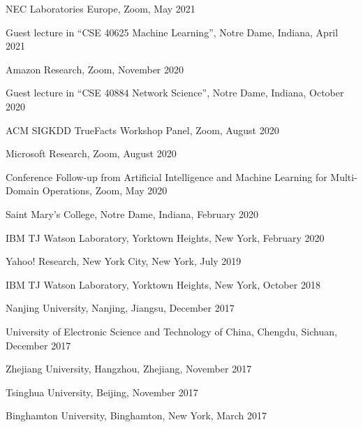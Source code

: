 \documentclass[10pt]{article}
\newenvironment{myindentpar}[1]%
{\begin{list}{}%
         {\setlength{\leftmargin}{#1}}%
         \item[]%
}
{\end{list}}
\newcounter{list}
\begin{document}
\begin{myindentpar}{0.75cm}

\hspace{-0.75cm} NEC Laboratories Europe, Zoom, May 2021
	
\hspace{-0.75cm} Guest lecture in ``CSE 40625 Machine Learning'', Notre Dame, Indiana, April 2021
	
\hspace{-0.75cm} Amazon Research, Zoom, November 2020

\hspace{-0.75cm} Guest lecture in ``CSE 40884 Network Science'', Notre Dame, Indiana, October 2020

\hspace{-0.75cm} ACM SIGKDD TrueFacts Workshop Panel, Zoom, August 2020
	
\hspace{-0.75cm} Microsoft Research, Zoom, August 2020
	
\hspace{-0.75cm} Conference Follow-up from Artificial Intelligence and Machine Learning for Multi-Domain Operations, Zoom, May 2020
	
\hspace{-0.75cm} Saint Mary's College, Notre Dame, Indiana, February 2020
	
\hspace{-0.75cm} IBM TJ Watson Laboratory, Yorktown Heights, New York, February 2020
	
\hspace{-0.75cm} Yahoo! Research, New York City, New York, July 2019

\hspace{-0.75cm} IBM TJ Watson Laboratory, Yorktown Heights, New York, October 2018
	
\hspace{-0.75cm} Nanjing University, Nanjing, Jiangsu, December 2017

\hspace{-0.75cm} University of Electronic Science and Technology of China, Chengdu, Sichuan, December 2017

\hspace{-0.75cm} Zhejiang University, Hangzhou, Zhejiang, November 2017

\hspace{-0.75cm} Tsinghua University, Beijing, November 2017

\hspace{-0.75cm} Binghamton University, Binghamton, New York, March 2017


\end{myindentpar}
\end{document}

